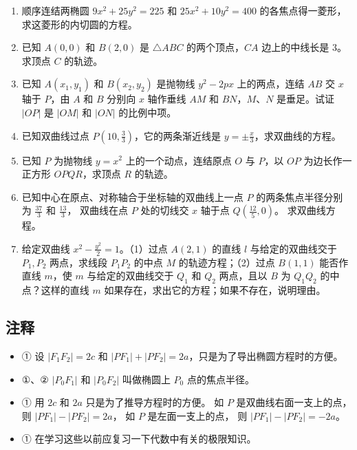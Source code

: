 \begin{enumerate}
\def\labelenumi{\arabic{enumi}.}
\setcounter{enumi}{3}
\item
  顺序连结两椭圆 \(9x^{2} + 25y^{2} = 225\) 和
  \(25x^{2} + 10y^{2} = 400\) 的各焦点得一菱形，求这菱形的内切圆的方程。
\item
  已知 \(A(0,0)\) 和 \(B(2,0)\) 是 \(\triangle ABC\) 的两个顶点，\(CA\)
  边上的中线长是 3。求顶点 \(C\) 的轨迹。
\item
  已知 \(A(x_1, y_1)\) 和 \(B(x_2, y_2)\) 是抛物线 \(y^2 - 2px\)
  上的两点，连结 \(AB\) 交 \(x\) 轴于 \(P\)，由 \(A\) 和 \(B\) 分别向
  \(x\) 轴作垂线 \(AM\) 和 \(BN\)，\(M\)、\(N\) 是垂足。试证 \(|OP|\) 是
  \(|OM|\) 和 \(|ON|\) 的比例中项。
\item
  已知双曲线过点 \(P\left(10, \frac{3}{3}\right)\)，它的两条渐近线是
  \(y = \pm \frac{x}{3}\)，求双曲线的方程。
\item
  已知 \(P\) 为抛物线 \(y = x^2\) 上的一个动点，连结原点 \(O\) 与
  \(P\)，以 \(OP\) 为边长作一正方形 \(OPQR\)，求顶点 \(R\) 的轨迹。
\item
  已知中心在原点、对称轴合于坐标轴的双曲线上一点 \(P\)
  的两条焦点半径分别为 \(\frac{37}{3}\) 和 \(\frac{13}{3}\)， 双曲线在点
  \(P\) 处的切线交 \(x\) 轴于点 \(Q\left(\frac{12}{5}, 0\right)\)。
  求双曲线方程。
\item
  给定双曲线 \(x^{2} - \frac{y^{2}}{2} = 1\)。（1）过点 \(A(2,1)\)
  的直线 \(l\) 与给定的双曲线交于 \(P_{1}, P_{2}\) 两点，求线段
  \(P_{1}P_{2}\) 的中点 \(M\) 的轨迹方程；（2）过点 \(B(1,1)\)
  能否作直线 \(m\)，使 \(m\) 与给定的双曲线交于 \(Q_{1}\) 和 \(Q_{2}\)
  两点，且以 \(B\) 为 \(Q_{1}Q_{2}\) 的中点？这样的直线 \(m\)
  如果存在，求出它的方程；如果不存在，说明理由。
\end{enumerate}

\subsection{注释}\label{ux6ce8ux91ca}

\begin{itemize}
\item
  ① 设 \(|F_1F_2| = 2c\) 和
  \(|PF_1| + |PF_2| = 2a\)，只是为了导出椭圆方程时的方便。
\item
  ①、② \(\left|P_{0}F_{1}\right|\) 和 \(\left|P_{0}F_{2}\right|\)
  叫做椭圆上 \(P_{0}\) 点的焦点半径。
\item
  ① 用 \(2c\) 和 \(2a\) 只是为了推导方程时的方便。 如 \(P\)
  是双曲线右面一支上的点， 则
  \(\left|PF_{1}\right| - \left|PF_{2}\right| = 2a\)， 如 \(P\)
  是左面一支上的点， 则
  \(\left|PF_{1}\right| - \left|PF_{2}\right| = -2a\)。
\item
  ① 在学习这些以前应复习一下代数中有关的极限知识。
\end{itemize}

